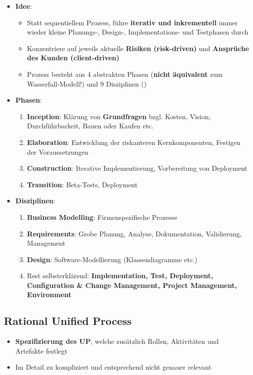 \begin{itemize}
	\item \textbf{Idee}:
	\begin{itemize}
		\item Statt sequentiellem Prozess, führe \textbf{iterativ und inkrementell} immer wieder kleine Planungs-, Design-, Implementations- und Testphasen durch
		\item Konzentriere auf jeweils aktuelle \textbf{Risiken (risk-driven)} und \textbf{Ansprüche des Kunden (client-driven)}
		\item Prozess besteht aus 4 abstrakten Phasen (\textbf{nicht äquivalent} zum Wasserfall-Modell!) und 9 Disziplinen ()
	\end{itemize}
	\item \textbf{Phasen}:
	\begin{enumerate}
		\item \textbf{Inception}: Klärung von \textbf{Grundfragen} bzgl. Kosten, Vision, Durchführbarkeit, Bauen oder Kaufen etc.
		\item \textbf{Elaboration}: Entwicklung der riskanteren Kernkomponenten, Festigen der Voraussetzungen
		\item \textbf{Construction}: Iterative Implementierung, Vorbereitung von Deployment
		\item \textbf{Transition}: Beta-Tests, Deployment
	\end{enumerate}
	\item \textbf{Disziplinen}:
	\begin{enumerate}
		\item \textbf{Business Modelling}: Firmenspezifische Prozesse
		\item \textbf{Requirements}: Grobe Planung, Analyse, Dokumentation, Validierung, Management
		\item \textbf{Design}: Software-Modellierung (Klassendiagramme etc.)
		\item Rest selbsterklärend: \textbf{Implementation, Test, Deployment, Configuration \& Change Management, Project Management, Environment}
	\end{enumerate}
\end{itemize}

\subsection{Rational Unified Process}
\label{sdp:sub:rational_unified_process}

\begin{itemize}
	\item \textbf{Spezifizierung des UP}, welche zusätzlich Rollen, Aktivitäten und Artefakte festlegt
	\item Im Detail zu kompliziert und entsprechend nicht genauer relevant
\end{itemize}